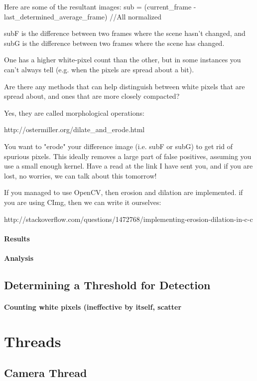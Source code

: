 \documentclass[11pt]{article} %
\begin{document}
{    Here are some of the resultant images:
    sub = (current_frame - last_determined_average_frame)   //All normalized

    subF is the difference between two frames where the scene hasn't changed,
    and subG is the difference between two frames where the scene has changed.

    One has a higher white-pixel count than the other, but in some instances
    you can't always tell (e.g. when the pixels are spread about a bit).


    Are there any methods that can help distinguish between white pixels that
    are spread about, and ones that are more closely compacted?


Yes, they are called morphological operations:

http://ostermiller.org/dilate_and_erode.html

You want to "erode" your difference image (i.e. subF or subG) to get rid of spurious pixels. This ideally removes a large part of false positives, assuming you use a small enough kernel. Have a read at the link I have sent you, and if you are lost, no worries, we can talk about this tomorrow!

If you managed to use OpenCV, then erosion and dilation are implemented. if you are using CImg, then we can write it ourselves:

http://stackoverflow.com/questions/1472768/implementing-erosion-dilation-in-c-c

\paragraph{Results}
\paragraph{Analysis}
\subsection{Determining a Threshold for Detection}
\paragraph{Counting white pixels (ineffective by itself, scatter}
\section{Threads}
\subsection{Camera Thread}
}
\end{document}
